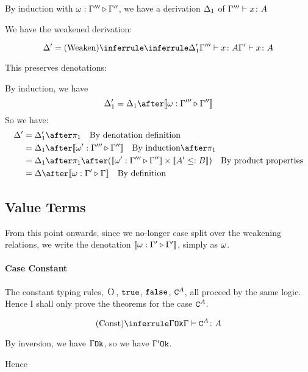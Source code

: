 {        By induction with $\omega : \Gamma''' \triangleright \Gamma''$,
         we have a derivation $\Delta_1$ of $\Gamma''' \vdash x \colon A$
    
        We have the weakened derivation:
    
        \begin{equation}
            \D' = \ntreeruleI{Weaken}{\treeruleI{\D_1'}{\typerelation{\G'''}{x}{A}}}{\typerelation{\G'}{x}{A}}
        \end{equation}
    
        This preserves denotations:
    
        By induction, we have
        \begin{equation}
            \D_1' = \D_1 \after \deno{\wrel{\w}{\G'''}{\G''}}
        \end{equation}
        So we have:
        \begin{align}
            \D' &= \D_1' \after \p\qt{By denotation definition}\\
            & = \D_1\after\deno{\wrel{\w'}{\G'''}{\G''}}\qt{By induction}\after\p \\
            & = \D_1\after\p\after(\deno{\wrel{\w'}{\G'''}{\G''}}\times\deno{A' \subtype B})\qt{By product properties}\\
            & = \D\after\deno{\wrel{\w}{\G'}{\G}}\qt{By definition}
        \end{align}
    
    \subsection{Value Terms}
    From this point onwards, since we no-longer case split over the weakening relations, we write the denotation ${\bf [\![}\omega : \Gamma' \triangleright \Gamma'{\bf ]\!]}$, simply as $\omega$.
    
    
    \paragraph{Case Constant}
    The constant typing rules, $\texttt{()}$, $\texttt{true}$, $\texttt{false}$, $\texttt{C}^{A}$, all proceed by the same logic. Hence I shall only prove the theorems for the case $\texttt{C}^{A}$.
    
    \begin{equation}
        \truleconst
    \end{equation}
    
    By inversion, we have $\Gamma \texttt{Ok}$, so we have $\Gamma' \texttt{Ok}$.
    
    Hence
    
}
